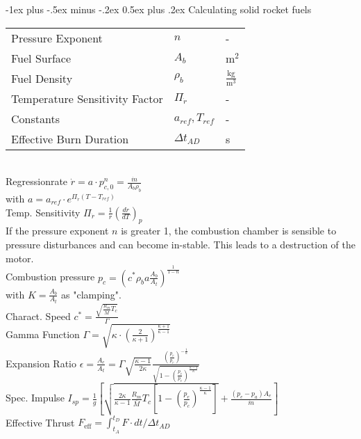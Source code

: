 \documentclass[10pt,landscape]{article}
\makeatletter
\renewcommand{\section}{\@startsection{section}{1}{0mm}%
                                {-1ex plus -.5ex minus -.2ex}%
                                {0.5ex plus .2ex}%
                                {\normalfont\large\bfseries}}
\makeatother
\begin{document}
\begin{multicols}{3}
\section{Calculating solid rocket fuels}
\begin{tabular}{lll}
	Pressure Exponent & $n$ & - \\
	Fuel Surface & $A_b$ & $\text{m}^2$ \\
	Fuel Density & $\rho_b$ & $\frac{\text{kg}}{\text{m}^3}$ \\
	Temperature Sensitivity Factor & $\Pi_{\dot{r}}$ & - \\
	Constants & $a_{ref}, T_{ref}$ & - \\
	Effective Burn Duration & $\Delta t_{AD}$ & s \\
\end{tabular}\\
\vspace{7pt}
Regressionrate $\dot{r}=a\cdot p_{c,0}^n = \frac{\dot{m}}{A_b\rho_b}$\\
with $a = a_{ref}\cdot e^{\Pi_{\dot{r}} (T-T_{ref})}$\\
Temp. Sensitivity $\Pi_{\dot{r}} = \frac{1}{\dot{r}} (\frac{d \dot{r}}{d T})_p$ \\
\vspace{5pt}
If the pressure exponent $n$ is greater 1, the combustion chamber is sensible to pressure disturbances and can become in-stable. This leads to a destruction of the motor.\\
\vspace{12pt}
Combustion pressure $p_c = (c^* \rho_b a \frac{A_b}{A_t})^\frac{1}{1-n}$\\
with $ K = \frac{A_b}{A_t}$ as "clamping".\\
\vspace{7pt}
Charact. Speed $c^* = \frac{\sqrt{\frac{R_m}{\bar{M}}T_c}}{\Gamma}$\\
Gamma Function $\Gamma = \sqrt{\kappa \cdot (\frac{2}{\kappa+1})^{\frac{\kappa+1}{\kappa-1}}}$\\
\vspace{7pt}
Expansion Ratio $\epsilon = \frac{A_e}{A_t} = \Gamma \sqrt{\frac{\kappa-1}{2 \kappa}} \frac{(\frac{p_e}{p_c})^{-\frac{1}{\kappa}}}{\sqrt{1-(\frac{p_e}{p_c})^\frac{\kappa-1}{\kappa}}}$\\
\vspace{7pt}
Spec. Impulse $I_{sp} = \frac{1}{g} \left[ \sqrt{\frac{2\kappa}{\kappa-1}\frac{R_m}{\bar{M}} T_c \left[1-(\frac{p_e}{p_c})^\frac{\kappa-1}{\kappa}\right]} + \frac{(p_e-p_a) A_e}{\dot{m}}\right]$\\
\vspace{12pt}
Effective Thrust $F_{\text{eff}}=\int_{t_A}^{t_D}F\cdot dt / \Delta t_{AD}$\\
\vspace{5pt}


\end{multicols}
\end{document}
